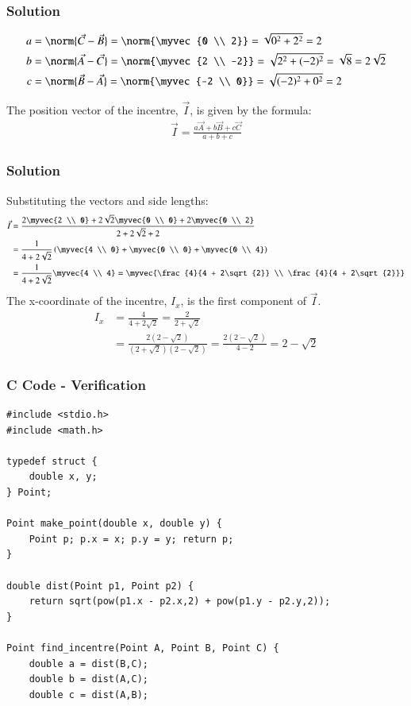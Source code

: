 \documentclass{beamer}
\begin{document}
\begin{frame}[fragile]
    \frametitle{Solution}
\begin{align}
a &= \norm{\vec{C} - \vec{B}} = \norm{\myvec{0 \\ 2}} = \sqrt{0^2 + 2^2} = 2 \\
b &= \norm{\vec{A} - \vec{C}} = \norm{\myvec{2 \\ -2}} = \sqrt{2^2 + (-2)^2} = \sqrt{8} = 2\sqrt{2} \\
c &= \norm{\vec{B} - \vec{A}} = \norm{\myvec{-2 \\ 0}} = \sqrt{(-2)^2 + 0^2} = 2
\end{align}

The position vector of the incentre, $\vec{I}$, is given by the formula:
\begin{align}
\vec{I} = \frac{a\vec{A} + b\vec{B} + c\vec{C}}{a+b+c}
\end{align}
\end{frame}

\begin{frame}[fragile]
    \frametitle{Solution}
Substituting the vectors and side lengths:
\begin{align}
\vec{I} &= \frac{2\myvec{2 \\ 0} + 2\sqrt{2}\myvec{0 \\ 0} + 2\myvec{0 \\ 2}}{2 + 2\sqrt{2} + 2} \\
    &= \frac{1}{4 + 2\sqrt{2}} \left( \myvec{4 \\ 0} + \myvec{0 \\ 0} + \myvec{0 \\ 4} \right) \\
    &= \frac{1}{4 + 2\sqrt{2}} \myvec{4 \\ 4} = \myvec{\frac{4}{4 + 2\sqrt{2}} \\ \frac{4}{4 + 2\sqrt{2}}}
\end{align}
The x-coordinate of the incentre, $I_x$, is the first component of $\vec{I}$.
\begin{align}
I_x &= \frac{4}{4 + 2\sqrt{2}} = \frac{2}{2 + \sqrt{2}} \\
    &= \frac{2(2 - \sqrt{2})}{(2 + \sqrt{2})(2 - \sqrt{2})} = \frac{2(2 - \sqrt{2})}{4-2} = 2 - \sqrt{2}
\end{align}
\end{frame}

\begin{frame}[fragile]
    \frametitle{C Code - Verification}
    \begin{lstlisting}
#include <stdio.h>
#include <math.h>

typedef struct {
    double x, y;
} Point;

Point make_point(double x, double y) {
    Point p; p.x = x; p.y = y; return p;
}

double dist(Point p1, Point p2) {
    return sqrt(pow(p1.x - p2.x,2) + pow(p1.y - p2.y,2));
}

Point find_incentre(Point A, Point B, Point C) {
    double a = dist(B,C);
    double b = dist(A,C);
    double c = dist(A,B);
    \end{lstlisting}
\end{frame}
\end{document}
